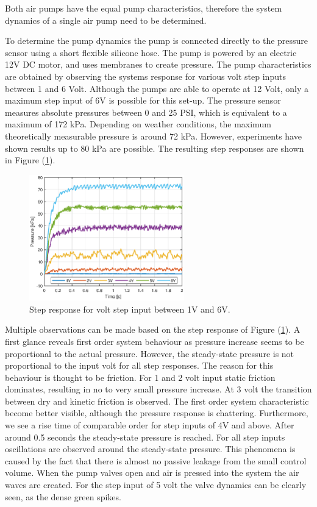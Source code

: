 \begin{theorem}
Both air pumps have the equal pump characteristics, therefore the system dynamics of a single air pump need to be determined.
\end{theorem}


To determine the pump dynamics the pump is connected directly to the pressure sensor using a short flexible silicone hose. The pump is powered by an electric 12V DC motor, and uses membranes to create pressure. The pump characteristics are obtained by observing the systems response for various volt step inputs between 1 and 6 Volt. Although the pumps are able to operate at 12 Volt, only a maximum step input of 6V is possible for this set-up. The pressure sensor measures absolute pressures between 0 and 25 PSI, which is equivalent to a maximum of 172 kPa. Depending on weather conditions, the maximum theoretically measurable pressure is around 72 kPa. However, experiments have shown results up to 80 kPa are possible. The resulting step responses are shown in Figure (\ref{fig1:pump_dynamcis}).

\begin{figure}[H]
    \centering
    \includegraphics[width = 0.6\textwidth]{Figures/Chapter3/stepresponsdirect16V.eps}
    \caption{Step response for volt step input between 1V and 6V.}
    \label{fig1:pump_dynamcis}
\end{figure}

Multiple observations can be made based on the step response of Figure (\ref{fig1:pump_dynamcis}). A first glance reveals first order system behaviour as  pressure increase seems to be proportional to the actual pressure. However, the steady-state pressure is not proportional to the input volt for all step responses. The reason for this behaviour is thought to be friction. For 1 and 2 volt input static friction dominates, resulting in no to very small pressure increase. At 3 volt the transition between dry and kinetic friction is observed. The first order system characteristic become better visible, although the pressure response is chattering. Furthermore, we see a rise time of comparable order for step inputs of 4V and above. After around 0.5 seconds the steady-state pressure is reached. For all step inputs oscillations are observed around the steady-state pressure. This phenomena is caused by the fact that there is almost no passive leakage from the small control volume. When the pump valves open and air is pressed into the system the air waves are created. For the step input of 5 volt the valve dynamics can be clearly seen, as the dense green spikes.

